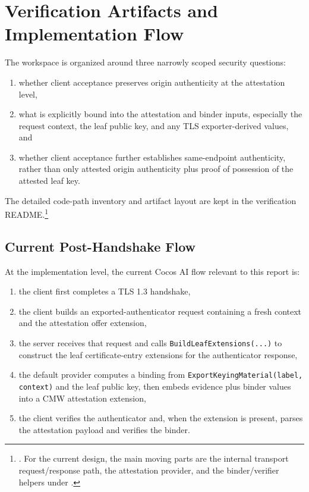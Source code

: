 \documentclass[11pt,a4paper]{article}
\begin{document}
\section{Verification Artifacts and Implementation Flow}

The workspace is organized around three narrowly scoped security questions:

\begin{enumerate}
\item whether client acceptance preserves origin authenticity at the
attestation level,
\item what is explicitly bound into the attestation and binder inputs,
especially the request context, the leaf public key, and any TLS
exporter-derived values, and
\item whether client acceptance further establishes same-endpoint
authenticity, rather than only attested origin authenticity plus proof of
possession of the attested leaf key.
\end{enumerate}

The detailed code-path inventory and artifact layout are kept in the
verification README.\footnote{. For the current
design, the main moving parts are the internal transport request/response path,
the attestation provider, and the binder/verifier helpers under
.}

\subsection{Current Post-Handshake Flow}

At the implementation level, the current Cocos AI flow relevant to this report is:

\begin{enumerate}
\item the client first completes a TLS 1.3 handshake,
\item the client builds an exported-authenticator request containing a fresh
context and the attestation offer extension,
\item the server receives that request and calls
\texttt{BuildLeafExtensions(...)} to construct the leaf certificate-entry
extensions for the authenticator response,
\item the default provider computes a binding from
\texttt{ExportKeyingMaterial(label, context)} and the leaf public key, then
embeds evidence plus binder values into a CMW attestation extension,
\item the client verifies the authenticator and, when the extension is present,
parses the attestation payload and verifies the binder.
\end{enumerate}
\end{document}
